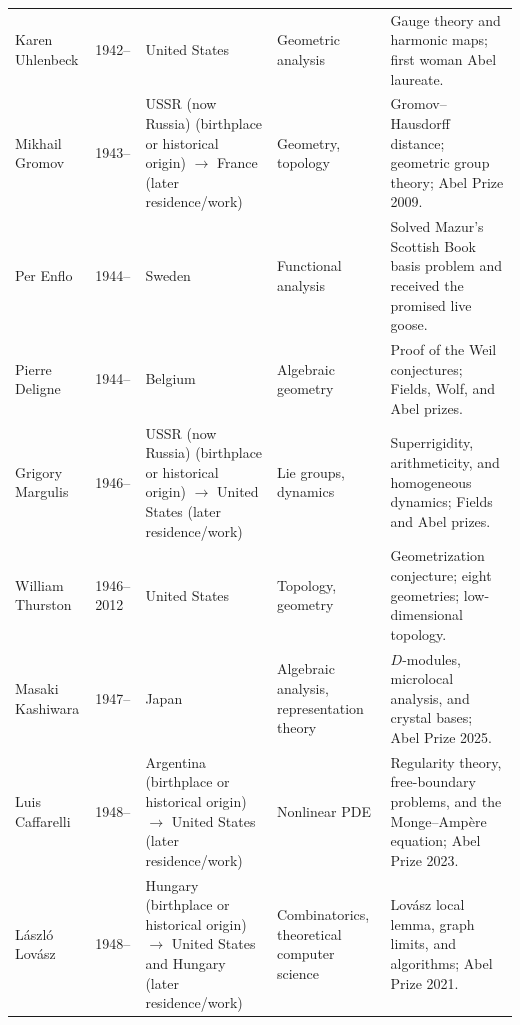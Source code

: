{\begin{longtable}{@{}L{0.145\textwidth}L{0.09\textwidth}L{0.225\textwidth}L{0.14\textwidth}L{0.30\textwidth}@{}}
        Karen Uhlenbeck
        & 1942--
        & United States
        & Geometric analysis
        & Gauge theory and harmonic maps; first woman Abel laureate. \\

        Mikhail Gromov
        & 1943--
        & USSR (now Russia) (birthplace or historical origin) \(\to\) France (later residence/work)
        & Geometry, topology
        & Gromov--Hausdorff distance; geometric group theory; Abel Prize 2009. \\

        Per Enflo
        & 1944--
        & Sweden
        & Functional analysis
        & Solved Mazur's Scottish Book basis problem and received the promised
          live goose. \\

        Pierre Deligne
        & 1944--
        & Belgium
        & Algebraic geometry
        & Proof of the Weil conjectures; Fields, Wolf, and Abel prizes. \\

        Grigory Margulis
        & 1946--
        & USSR (now Russia) (birthplace or historical origin) \(\to\) United States (later residence/work)
        & Lie groups, dynamics
        & Superrigidity, arithmeticity, and homogeneous dynamics; Fields and
          Abel prizes. \\

        William Thurston
        & 1946--2012
        & United States
        & Topology, geometry
        & Geometrization conjecture; eight geometries; low-dimensional
          topology. \\

        Masaki Kashiwara
        & 1947--
        & Japan
        & Algebraic analysis, representation theory
        & $D$-modules, microlocal analysis, and crystal bases; Abel Prize 2025. \\

        Luis Caffarelli
        & 1948--
        & Argentina (birthplace or historical origin) \(\to\) United States (later residence/work)
        & Nonlinear PDE
        & Regularity theory, free-boundary problems, and the Monge--Ampère
          equation; Abel Prize 2023. \\

        László Lovász
        & 1948--
        & Hungary (birthplace or historical origin) \(\to\) United States and Hungary (later residence/work)
        & Combinatorics, theoretical computer science
        & Lovász local lemma, graph limits, and algorithms; Abel Prize 2021. \\


\end{longtable}}
